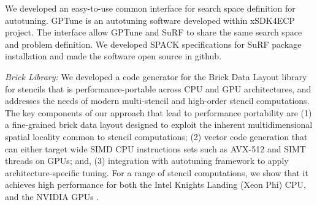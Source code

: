 We developed an easy-to-use common interface for search space definition for autotuning. GPTune is an autotuning software developed within xSDK4ECP project. The interface allow GPTune and SuRF to share the same search space and problem definition. We developed SPACK specifications for SuRF package installation and made the software open source in github.



\vspace*{.1in}
\noindent
\textit{Brick Library:}
We developed a code generator for the Brick Data Layout library for stencils
that is performance-portable across CPU and GPU architectures, and addresses the
needs of modern multi-stencil and high-order stencil computations. The key
components of our approach that lead to performance portability are (1) a
fine-grained brick data layout designed to exploit the inherent multidimensional
spatial locality common to stencil computations; (2) vector code generation that
can either target wide SIMD CPU instructions sets such as AVX-512 and SIMT
threads on GPUs; and, (3) integration with autotuning framework to apply
architecture-specific tuning. For a range of stencil computations, we show that
it achieves high performance for both the Intel Knights Landing (Xeon Phi) CPU,
and the NVIDIA GPUs \cite{P3HPC_Bricks,zhao2019}. 

